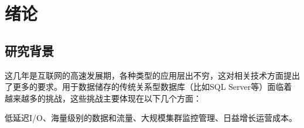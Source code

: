 \documentclass{zjutthesis}
\begin{document}



\frontmatter



\tableofcontents           %

\listoffigures             %
\listoftables              %


\mainmatter


\chapter{绪论}
\section{研究背景}
这几年是互联网的高速发展期，各种类型的应用层出不穷，这对相关技术方面提出了更多的要求。用于数据储存的传统关系型数据库\cite{ref:1}（比如SQL Server等）面临着越来越多的挑战，这些挑战主要体现在以下几个方面：

低延迟I/O、海量级别的数据和流量、大规模集群监控管理、日益增长运营成本。
\end{document}
